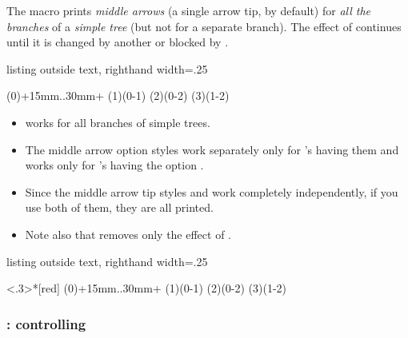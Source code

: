 The macro \icmd{\xtShowMidArrows} prints \emph{middle arrows} (a single arrow tip, by default) for \emph{all the branches} of a \emph{simple tree} (but not for a separate branch).
The effect of \cmd{\xtShowMidArrows} continues until it is changed by another \cmd{\xtShowMidArrows} or blocked by \icmd{\xtHideMidArrows}.

\begin{tcblisting}{listing outside text, righthand width=.25\linewidth}
\begin{istgame}
\xtShowMidArrows
\istroot(0)+15mm..30mm+  \istb[blue] \istb[red] \endist
\xtHideMidArrows
\istroot(1)(0-1)  \istb \istb \endist
\istroot(2)(0-2)  \istb \istb \endist
\xtShowMidArrows
\istroot(3)(1-2)  \istb \istb \endist
\end{istgame}
\end{tcblisting}


\remark
\begin{itemize}\firmlist
\item \cmd{\xtShowMidArrows} works for all branches of simple trees.
\item The middle arrow option styles work separately only for \cmd{\istb}'s having them and \cmd{\setxtarrowtips} works only for \cmd{\istb}'s having the option \xw{->-}.
\item Since the middle arrow tip styles and \cmd{\xtShowMidArrows} work completely independently, if you use both of them, they are all printed.
\item Note also that \cmd{\xtHideMidArrows} removes only the effect of \cmd{\xtShowMidArrows}.
\end{itemize}

\begin{tcblisting}{listing outside text, righthand width=.25\linewidth}
\begin{istgame}
\setxtarrowtips<.3>{*}[red]
\xtShowMidArrows
\istroot(0)+15mm..30mm+  \istb[blue] \istb[red] \endist
\xtHideMidArrows
\istroot(1)(0-1)  \istb[->-] \istb[-o-] \endist
\istroot(2)(0-2)  \istb \istb \endist
\xtShowMidArrows
\istroot(3)(1-2)  \istb[->-] \istb[-o-] \endist
\end{istgame}
\end{tcblisting}


\subsubsection{\protect\cmd{\setxtshowmidarrows}: controlling \protect\cmd{\xtShowMidArrows}}

